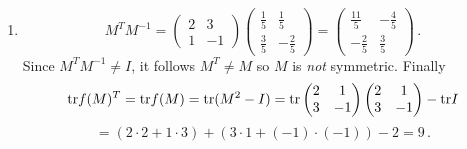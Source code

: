 \begin{enumerate}
\item
\[
M^T M^{-1}=
\begin{pmatrix}2&3\\1&-1\end{pmatrix}\begin{pmatrix}\frac15&\frac15\\[1mm]\frac35&-\frac25\end{pmatrix}
=\begin{pmatrix}\frac{11}5&-\frac45\\-\frac25&\frac35\end{pmatrix}\, .
\]
Since $M^TM^{-1}\neq I$, it follows $M^T\neq M$ so $M$ is {\it not} symmetric.
Finally
\[
{\rm tr} f(M)^T= {\rm tr} f(M) = {\rm tr}(M^2-I)={\rm tr}\begin{pmatrix}2&1\\3&-1\end{pmatrix}\begin{pmatrix}2&1\\3&-1\end{pmatrix}-{\rm tr} I
\]
\[
=(2\cdot 2+1\cdot 3)+(3\cdot 1+(-1)\cdot(-1))-2=9\, .
\]


\end{enumerate}
